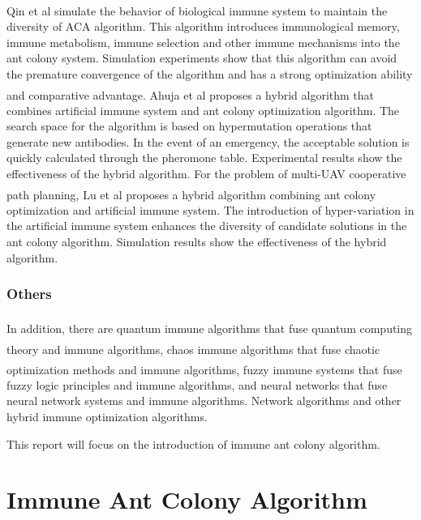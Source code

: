 \documentclass[11pt,a4paper,oldfontcommands]{memoir}
\newcommand{\upcite}[1]{\textsuperscript{\textsuperscript{\cite{#1}}}}
\begin{document}
Qin et al\upcite{Qin.2006} simulate the behavior of biological immune system to maintain the diversity of ACA algorithm. This algorithm introduces immunological memory, immune metabolism, immune selection and other immune mechanisms into the ant colony system. Simulation experiments show that this algorithm can avoid the premature convergence of the algorithm and has a strong optimization ability and comparative advantage. Ahuja et al\upcite{Ahuja.2007} proposes a hybrid algorithm that combines artificial immune system and ant colony optimization algorithm. The search space for the algorithm is based on hypermutation operations that generate new antibodies. In the event of an emergency, the acceptable solution is quickly calculated through the pheromone table. Experimental results show the effectiveness of the hybrid algorithm. For the problem of multi-UAV cooperative path planning, Lu et al\upcite{Lu.2011} proposes a hybrid algorithm combining ant colony optimization and artificial immune system. The introduction of hyper-variation in the artificial immune system enhances the diversity of candidate solutions in the ant colony algorithm. Simulation results show the effectiveness of the hybrid algorithm.

\subsection{Others}
In addition, there are quantum immune algorithms\upcite{Jiao.2008} that fuse quantum computing theory and immune algorithms, chaos immune algorithms\upcite{Solak.2012} that fuse chaotic optimization methods and immune algorithms, fuzzy immune systems\upcite{Liu.2012} that fuse fuzzy logic principles and immune algorithms, and neural networks that fuse neural network systems and immune algorithms. Network algorithms and other hybrid immune optimization algorithms.

This report will focus on the introduction of immune ant colony algorithm.

\chapter{Immune Ant Colony Algorithm}
\end{document}
